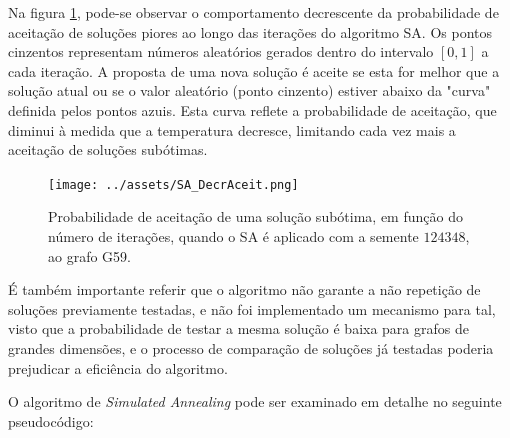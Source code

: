 \documentclass[mirror, portugues]{revdetua}
\begin{document}
Na figura \ref{fig:sa_aceitacao}, pode-se observar o comportamento decrescente da probabilidade de aceitação de soluções piores ao longo das iterações do algoritmo SA. Os pontos cinzentos representam números aleatórios gerados dentro do intervalo $[0,1]$ a cada iteração. A proposta de uma nova solução é aceite se esta for melhor que a solução atual ou se o valor aleatório (ponto cinzento) estiver abaixo da "curva" definida pelos pontos azuis. Esta curva reflete a probabilidade de aceitação, que diminui à medida que a temperatura decresce, limitando cada vez mais a aceitação de soluções subótimas.

\begin{figure}[H]
    \centering
    \texttt{[image: ../assets/SA\_DecrAceit.png]}
    \caption{Probabilidade de aceitação de uma solução subótima, em função do número de iterações, quando o SA é aplicado com a semente $124348$, ao grafo G59.}
    \label{fig:sa_aceitacao}
\end{figure}

É também importante referir que o algoritmo não garante a não repetição de soluções previamente testadas, e não foi implementado um mecanismo para tal, visto que a probabilidade de testar a mesma solução é baixa para grafos de grandes dimensões, e o processo de comparação de soluções já testadas poderia prejudicar a eficiência do algoritmo.


O algoritmo de \textit{Simulated Annealing} pode ser examinado em detalhe no seguinte pseudocódigo:
\end{document}
